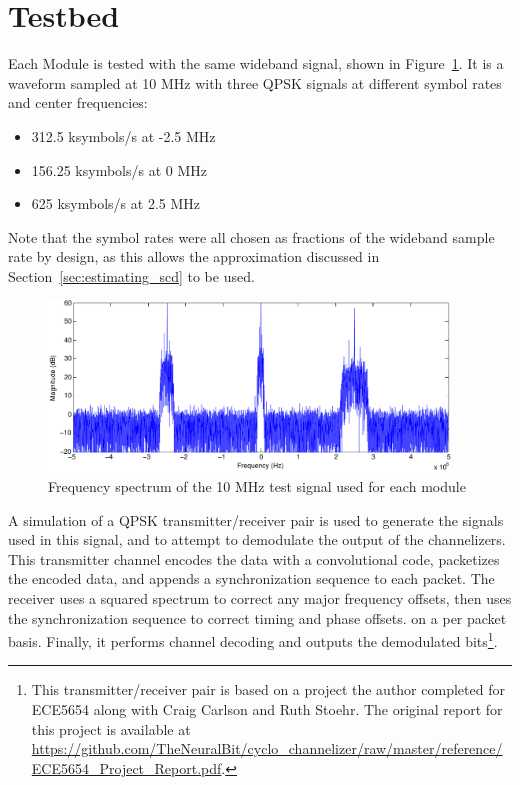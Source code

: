 \documentclass[12pt]{report}
\begin{document}
\section{Testbed}
Each Module is tested with the same wideband signal, shown in
Figure~\ref{fig:test_signal}. It is a waveform sampled at 10 MHz with three
QPSK signals at different symbol rates and center frequencies:
\begin{itemize}
    \item{312.5 ksymbols/s at -2.5 MHz}
    \item{156.25 ksymbols/s at 0 MHz}
    \item{625 ksymbols/s at 2.5 MHz}
\end{itemize}
Note that the symbol rates were all chosen as fractions of the wideband sample
rate by design, as this allows the approximation discussed in
Section~\ref{sec:estimating_scd} to be used.

\begin{figure}[h]
    \begin{center}
        \includegraphics[width=0.95\textwidth]{test_signal}
    \end{center}
    \caption{Frequency spectrum of the 10 MHz test signal used for each module}
    \label{fig:test_signal}
\end{figure}

A simulation of a QPSK transmitter/receiver pair is used to generate the
signals used in this signal, and to attempt to demodulate the output of the
channelizers. This transmitter channel encodes the data with a convolutional
code, packetizes the encoded data, and appends a synchronization sequence to
each packet. The receiver uses a squared spectrum to correct any major
frequency offsets, then uses the synchronization sequence to correct timing and
phase offsets. on a per packet basis. Finally, it performs channel decoding and
outputs the demodulated bits\footnote{This transmitter/receiver pair is based
on a project the author completed for ECE5654 along with Craig Carlson and Ruth Stoehr.
The original report for this project is available at
\url{https://github.com/TheNeuralBit/cyclo_channelizer/raw/master/reference/ECE5654_Project_Report.pdf}.}.
\end{document}
